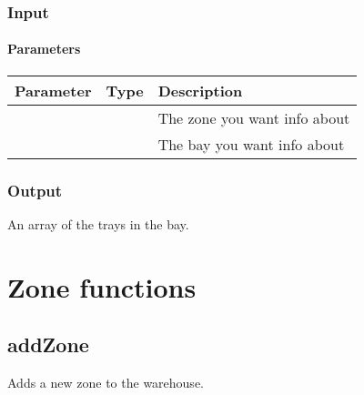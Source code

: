 \documentclass[letterpaper,10pt,english]{sphinxmanual}
\let\oldsubsection\subsection
\renewcommand{\subsection}{\needspace{6\baselineskip}\oldsubsection}
\begin{document}
\subsubsection{Input}
\label{\detokenize{docs/Developer/getTraysInBay:input}}
\begin{sphinxVerbatim}[commandchars=\\\{\}]
   
   
\end{sphinxVerbatim}


\paragraph{Parameters}
\label{\detokenize{docs/Developer/getTraysInBay:parameters}}

\begin{savenotes}\sphinxattablestart
\centering
\begin{tabulary}{\linewidth}[t]{|T|T|T|}
\hline
\sphinxstyletheadfamily 
Parameter
&\sphinxstyletheadfamily 
Type
&\sphinxstyletheadfamily 
Description
\\
\hline
{}
&
&
The zone you want info about
\\
\hline
{}
&
&
The bay you want info about
\\
\hline
\end{tabulary}
\par
\sphinxattableend\end{savenotes}


\subsubsection{Output}
\label{\detokenize{docs/Developer/getTraysInBay:output}}
An array of the trays in the bay.


\section{Zone functions}
\label{\detokenize{docs/Developer/index:zone-functions}}

\subsection{addZone}
\label{\detokenize{docs/Developer/addZone:addzone}}\label{\detokenize{docs/Developer/addZone::doc}}
Adds a new zone to the warehouse.
\end{document}

